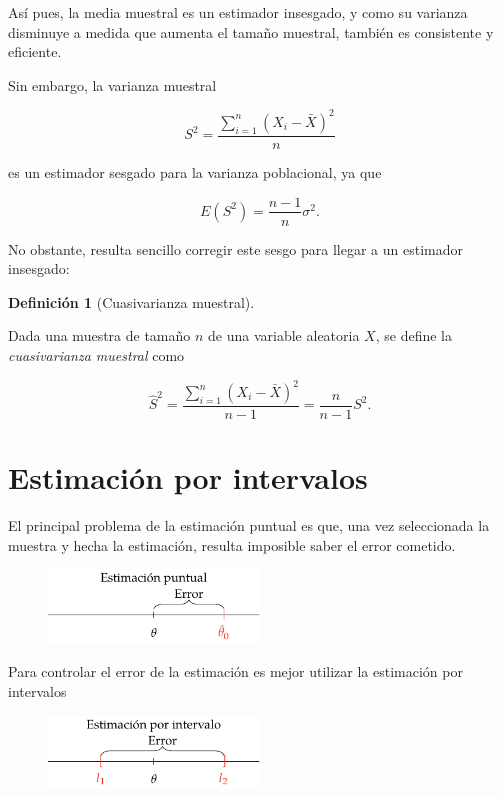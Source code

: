 \documentclass[
  a4paper,
]{scrreport}
\theoremstyle{definition}
\newtheorem{definition}{Definición}[chapter]
\theoremstyle{definition}
\theoremstyle{plain}
\theoremstyle{remark}
\begin{document}
Así pues, la media muestral es un estimador insesgado, y como su
varianza disminuye a medida que aumenta el tamaño muestral, también es
consistente y eficiente.

Sin embargo, la varianza muestral

\[
S^2 = \frac{\sum_{i=1}^n (X_i-\bar X)^2}{n}
\]

es un estimador sesgado para la varianza poblacional, ya que

\[
E(S^2)= \frac{n-1}{n}\sigma^2.
\]

No obstante, resulta sencillo corregir este sesgo para llegar a un
estimador insesgado:

\begin{definition}[Cuasivarianza
muestral]\protect\hypertarget{def-cuasivarianza-muestral}{}\label{def-cuasivarianza-muestral}

Dada una muestra de tamaño \(n\) de una variable aleatoria \(X\), se
define la \emph{cuasivarianza muestral} como

\[
\hat{S}^2 = \frac{\sum_{i=1}^n (X_i-\bar X)^2}{n-1} = \frac{n}{n-1}S^2.
\]

\end{definition}

\hypertarget{estimaciuxf3n-por-intervalos}{%
\section{Estimación por intervalos}\label{estimaciuxf3n-por-intervalos}}

El principal problema de la estimación puntual es que, una vez
seleccionada la muestra y hecha la estimación, resulta imposible saber
el error cometido.

\begin{figure}

{\centering \includegraphics[width=0.5\textwidth,height=\textheight]{img/estimacion/error-estimacion-puntual.pdf}

}

\end{figure}

Para controlar el error de la estimación es mejor utilizar la estimación
por intervalos

\begin{figure}

{\centering \includegraphics[width=0.5\textwidth,height=\textheight]{img/estimacion/error-estimacion-intervalo.pdf}

}

\end{figure}
\end{document}
